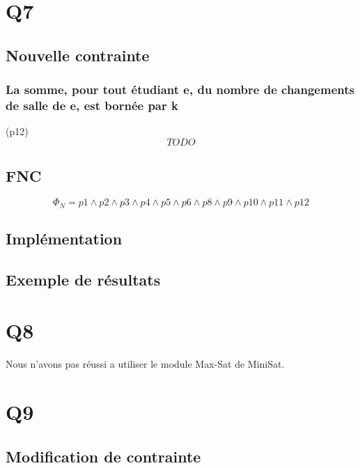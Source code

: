 \documentclass[a4paper,11pt]{article}
\begin{document}
\section{Q7}
\subsection{Nouvelle contrainte}
\subsubsection{La somme, pour tout étudiant e, du nombre de changements de salle de e, est bornée par k}
(p12)
\begin{displaymath}
	TODO	
\end{displaymath}

\subsection{FNC}
\begin{displaymath}
	\Phi_{N} = p1 \wedge p2 \wedge p3 \wedge p4 \wedge p5 \wedge p6 \wedge p8 \wedge p9 \wedge p10 \wedge p11 \wedge p12
\end{displaymath}
	
\subsection{Implémentation}
\subsection{Exemple de résultats}

\section{Q8}

Nous n'avons pas réussi a utiliser le module Max-Sat de MiniSat.


\section{Q9}

\subsection{Modification de contrainte}
\end{document}

